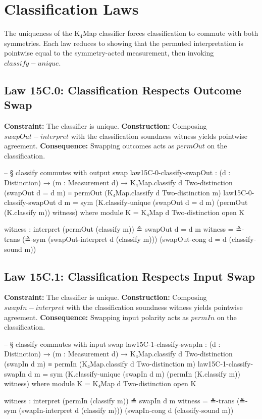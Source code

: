 \documentclass[11pt,a4paper]{book}
\def\texttt#1{#1}%
\begin{document}
\section{Classification Laws}

The uniqueness of the K$_4$Map classifier forces classification to commute
with both symmetries.  Each law reduces to showing that the permuted
interpretation is pointwise equal to the symmetry-acted measurement, then
invoking $\texttt{classify-unique}$.

\subsection{Law 15C.0: Classification Respects Outcome Swap}

\textbf{Constraint:} The classifier is unique.
\textbf{Construction:} Composing $\texttt{swapOut-interpret}$ with the classification
soundness witness yields pointwise agreement.
\textbf{Consequence:} Swapping outcomes acts as $\texttt{permOut}$ on the classification.

\begin{code}
-- § classify commutes with output swap
law15C-0-classify-swapOut :
  (d : Distinction) →
  (m : Measurement d) →
  K₄Map.classify d Two-distinction (swapOut {d = d} m)
  ≡ permOut (K₄Map.classify d Two-distinction m)
law15C-0-classify-swapOut d m =
  sym
    (K.classify-unique
      (swapOut {d = d} m)
      (permOut (K.classify m))
      witness)
  where
    module K = K₄Map d Two-distinction
    open K

    witness : interpret (permOut (classify m)) ≗ swapOut {d = d} m
    witness =
      ≗-trans
        (≗-sym (swapOut-interpret d (classify m)))
          (swapOut-cong {d = d} (classify-sound m))
\end{code}

\subsection{Law 15C.1: Classification Respects Input Swap}

\textbf{Constraint:} The classifier is unique.
\textbf{Construction:} Composing $\texttt{swapIn-interpret}$ with the classification
soundness witness yields pointwise agreement.
\textbf{Consequence:} Swapping input polarity acts as $\texttt{permIn}$ on the classification.

\begin{code}
-- § classify commutes with input swap
law15C-1-classify-swapIn :
  (d : Distinction) →
  (m : Measurement d) →
  K₄Map.classify d Two-distinction (swapIn d m)
  ≡ permIn (K₄Map.classify d Two-distinction m)
law15C-1-classify-swapIn d m =
  sym
    (K.classify-unique
      (swapIn d m)
      (permIn (K.classify m))
      witness)
  where
    module K = K₄Map d Two-distinction
    open K

    witness : interpret (permIn (classify m)) ≗ swapIn d m
    witness =
      ≗-trans
        (≗-sym (swapIn-interpret d (classify m)))
        (swapIn-cong d (classify-sound m))
\end{code}
\end{document}
